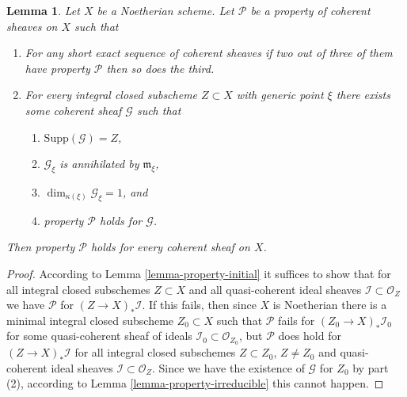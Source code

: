 \documentclass{stacks-project}
\theoremstyle{plain}
\newtheorem{lemma}[subsection]{Lemma}
\theoremstyle{definition}
\theoremstyle{remark}
\numberwithin{equation}{subsection}
\begin{document}
\begin{lemma}
\label{lemma-property}
Let $X$ be a Noetherian scheme.
Let $\mathcal{P}$ be a property of coherent sheaves on $X$ such that
\begin{enumerate}
\item For any short exact sequence of coherent sheaves if two
out of three of them have property $\mathcal{P}$ then so does the
third.
\item For every integral closed subscheme $Z \subset X$
with generic point $\xi$ there exists
some coherent sheaf $\mathcal{G}$ such that
\begin{enumerate}
\item $\text{Supp}(\mathcal{G}) = Z$,
\item $\mathcal{G}_\xi$ is annihilated by $\mathfrak m_\xi$,
\item $\dim_{\kappa(\xi)} \mathcal{G}_\xi = 1$, and
\item property $\mathcal{P}$ holds for $\mathcal{G}$.
\end{enumerate}
\end{enumerate}
Then property $\mathcal{P}$ holds for every coherent sheaf
on $X$.
\end{lemma}

\begin{proof}
According to Lemma \ref{lemma-property-initial} it suffices to show that
for all integral closed subschemes $Z \subset X$ and all quasi-coherent
ideal sheaves $\mathcal{I} \subset \mathcal{O}_Z$ we have $\mathcal{P}$
for $(Z \to X)_*\mathcal{I}$. If this fails, then since $X$ is Noetherian
there is a minimal integral closed subscheme $Z_0 \subset X$ such that
$\mathcal{P}$ fails for $(Z_0 \to X)_*\mathcal{I}_0$ for some
quasi-coherent sheaf of ideals $\mathcal{I}_0 \subset \mathcal{O}_{Z_0}$,
but $\mathcal{P}$ does hold for $(Z \to X)_*\mathcal{I}$ for all integral
closed subschemes $Z \subset Z_0$, $Z \not = Z_0$ and quasi-coherent
ideal sheaves $\mathcal{I} \subset \mathcal{O}_Z$. Since we have the
existence of $\mathcal{G}$ for $Z_0$ by part (2), according to
Lemma \ref{lemma-property-irreducible} this cannot happen.
\end{proof}
\end{document}
